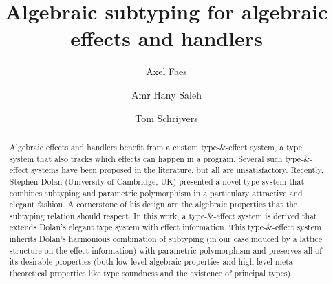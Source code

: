 \documentclass[acmsmall,10pt]{acmart}\settopmatter{printfolios=true}
\begin{document}
\title{Algebraic subtyping for algebraic effects and handlers}

\author{Axel Faes}

\author{Amr Hany Saleh}

\author{Tom Schrijvers}


\begin{abstract}
  Algebraic effects and handlers benefit from a custom type-\&-effect system, a type system that also tracks which effects can happen in a program. Several such type-\&-effect systems have been proposed in the literature, but all are unsatisfactory. Recently, Stephen Dolan (University of Cambridge, UK) presented a novel type system that combines subtyping and parametric polymorphism in a particulary attractive and elegant fashion. A cornerstone of his design are the algebraic properties that the subtyping relation should respect. In this work, a type-\&-effect system is derived that extends Dolan's elegant type system with effect information. This type-\&-effect system inherits Dolan's harmonious combination of subtyping (in our case induced by a lattice structure on the effect information) with parametric polymorphism and preserves all of its desirable properties (both low-level algebraic properties and high-level meta-theoretical properties like type soundness and the existence of principal types).
\end{abstract}

\maketitle
\end{document}
